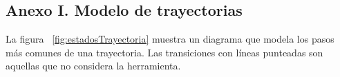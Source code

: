 
\subsection*{Anexo I. Modelo de trayectorias}
\hypertarget{Anexo 1}{}
La figura ~\ref{fig:estadosTrayectoria} muestra un diagrama que modela los pasos más comunes de una trayectoria. Las transiciones con líneas punteadas
son aquellas que no considera la herramienta.

